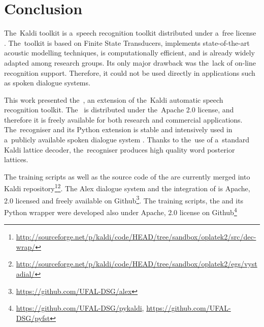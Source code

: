 \chapter{Conclusion}
\label{cha:conclusion}


The~Kaldi toolkit is a~speech recognition toolkit distributed under a~free license \cite{povey2011kaldi}.
The~toolkit is based on Finite State Transducers, implements state-of-the-art acoustic modelling techniques, is computationally efficient, and is already widely adapted among research groups.
Its only major drawback was the~lack of on-line recognition support.
Therefore, it could not be used directly in applications such as spoken dialogue systems.

This work presented the~, an extension of the~Kaldi automatic speech recognition toolkit.
The~ is distributed under the~Apache 2.0 license, and therefore it is freely available for both research and commercial applications.
The~recogniser and its Python extension is stable and intensively used in a~publicly available spoken dialogue system \cite{ptics2014url}.
Thanks to the~use of a~standard Kaldi lattice decoder, the~recogniser produces high quality word posterior lattices.


The training scripts as well as the source code of the  are currently merged into Kaldi repository\footnote{\url{http://sourceforge.net/p/kaldi/code/HEAD/tree/sandbox/oplatek2/src/dec-wrap/}}\footnote{\url{http://sourceforge.net/p/kaldi/code/HEAD/tree/sandbox/oplatek2/egs/vystadial/}}.
The Alex dialogue system and the integration of  is Apache, 2.0 licensed and freely available on Github\footnote{\url{https://github.com/UFAL-DSG/alex}}.
The training scripts, the  and its Python wrapper  were developed also under Apache, 2.0 license on Github\footnote{\url{https://github.com/UFAL-DSG/pykaldi}, \url{https://github.com/UFAL-DSG/pyfst}} 

